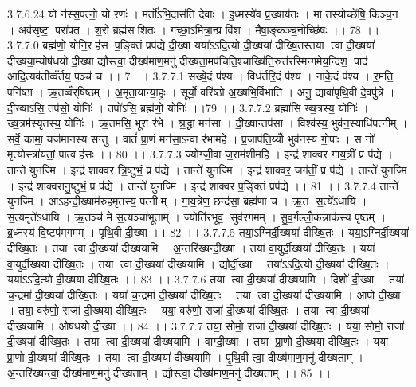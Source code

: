 3.7.6.24
यो न॑स्स॒पत्नो॒ यो रणः॑ । मर्तो॑ऽभि॒दास॑ति देवाः । इ॒ध्मस्ये॑व प्र॒ख्षाय॑तः । मा तस्योच्छे॑षि॒ किञ्च॒न । अव॑सृष्ट॒ परा॑पत । श॒रो ब्रह्म॑सशितः । गच्छा॒ऽमित्रा॒न्प्र वि॑श । मैषा॒ङ्कञ्च॒नोच्छि॑षः ।। 78 ।।
3.7.7.0
ब्रह्म॑णो॒ योनि॒रह॑स प॒ङ्क्तिं प्रप॑द्ये दी॒ख्षा यया॑ऽऽदि॒त्यो दी॒ख्षया॑ दीख्षि॒तस्तया त्वा दी॒ख्षया॑ दीख्षया॒म्योष॑धयो दी॒ख्षा द्यौस्त्वा॒ दीख्ष॑माण॒मनु॑ दीख्षता॒मप॑चिति॒श्चाख्षि॑ति॒रुत्त॑रस्मिन्गमेय॒न्दिश॒ पाद॑ आदि॒त्यव॑तीव्वँर्तय॒ पञ्च॑ च ।। 7 ।।
3.7.7.1
सख्षे॒दं प॑श्य । विध॑र्तरि॒दं प॑श्य । नाके॒दं प॑श्य । र॒मति॒ पनि॑ष्ठा । ऋ॒तव्वँर्‌षि॑ष्ठम् । अ॒मृता॒यान्या॒हुः । सूर्यो॒ वरि॑ष्ठो अ॒ख्षभि॒र्विभा॑ति । अनु॒ द्यावा॑पृथि॒वी दे॒वपु॑त्रे । दी॒ख्षाऽसि॒ तप॑सो॒ योनिः॑ । तपो॑ऽसि॒ ब्रह्म॑णो॒ योनिः॑ ।।79 ।।
3.7.7.2
ब्रह्मा॑सि ख्ष॒त्रस्य॒ योनिः॑ । ख्ष॒त्रम॑स्यृ॒तस्य॒ योनिः॑ । ऋ॒तम॑सि॒ भूरा र॑भे । श्र॒द्धां मन॑सा । दी॒ख्षान्तप॑सा । विश्व॑स्य॒ भुव॑न॒स्याधि॑पत्नीम् । सर्वे॒ कामा॒ यज॑मानस्य सन्तु । वातं॑ प्रा॒णं मन॑सा॒ऽन्वा र॑भामहे । प्र॒जाप॑ति॒य्योँ भुव॑नस्य गो॒पाः । स नो॑ मृ॒त्योस्त्रा॑यतां॒ पात्वह॑सः ।। 80 ।।
3.7.7.3
ज्योग्जी॒वा ज॒राम॑शीमहि । इन्द्र॑ शाक्वर गाय॒त्रीं प्र प॑द्ये । तान्ते॑ युनज्मि । इन्द्र॑ शाक्वर त्रि॒ष्टुभं॒ प्र प॑द्ये । तान्ते॑ युनज्मि । इन्द्र॑ शाक्वर॒ जग॑तीं॒ प्र प॑द्ये । तान्ते॑ युनज्मि । इन्द्र॑ शाक्वरानु॒ष्टुभं॒ प्र प॑द्ये । तान्ते॑ युनज्मि । इन्द्र॑ शाक्वर प॒ङ्क्तिं प्रप॑द्ये ।। 81 ।।
3.7.7.4
तान्ते॑ युनज्मि । आऽहन्दी॒ख्षाम॑रुहमृ॒तस्य॒ पत्नीम् । गा॒य॒त्रेण॒ छन्द॑सा॒ ब्रह्म॑णा च । ऋ॒त स॒त्ये॑ऽधायि । स॒त्यमृ॒ते॑ऽधायि । ऋ॒तञ्च॑ मे स॒त्यञ्चा॑भूताम् । ज्योति॑रभूव॒॒ सुव॑रगमम् । सु॒व॒र्गल्लोँ॒कन्नाक॑स्य पृ॒ष्ठम् । ब्र॒ध्नस्य॑ वि॒ष्टप॑मगमम् । पृ॒थि॒वी दी॒ख्षा ।। 82 ।।
3.7.7.5
तया॒ऽग्निर्दी॒ख्षया॑ दीख्षि॒तः । यया॒ऽग्निर्दी॒ख्षया॑ दीख्षि॒तः । तया त्वा दी॒ख्षया॑ दीख्षयामि । अ॒न्तरि॑ख्षन्दी॒ख्षा । तया॑ वा॒युर्दी॒ख्षया॑ दीख्षि॒तः । यया॑ वा॒युर्दी॒ख्षया॑ दीख्षि॒तः । तया त्वा दी॒ख्षया॑ दीख्षयामि । द्यौर्दी॒ख्षा । तया॑ऽऽदि॒त्यो दी॒ख्षया॑ दीख्षि॒तः । यया॑ऽऽदि॒त्यो दी॒ख्षया॑ दीख्षि॒तः ।। 83 ।।
3.7.7.6
तया त्वा दी॒ख्षया॑ दीख्षयामि । दिशो॑ दी॒ख्षा । तया॑ च॒न्द्रमा॑ दी॒ख्षया॑ दीख्षि॒तः । यया॑ च॒न्द्रमा॑ दी॒ख्षया॑ दीख्षि॒तः । तया त्वा दी॒ख्षया॑ दीख्षयामि । आपो॑ दी॒ख्षा । तया॒ वरु॑णो॒ राजा॑ दी॒ख्षया॑ दीख्षि॒तः । यया॒ वरु॑णो॒ राजा॑ दी॒ख्षया॑ दीख्षि॒तः । तया त्वा दी॒ख्षया॑ दीख्षयामि । ओष॑धयो दी॒ख्षा ।। 84 ।।
3.7.7.7
तया॒ सोमो॒ राजा॑ दी॒ख्षया॑ दीख्षि॒तः । यया॒ सोमो॒ राजा॑ दी॒ख्षया॑ दीख्षि॒तः । तया त्वा दी॒ख्षया॑ दीख्षयामि । वाग्दी॒ख्षा । तया प्रा॒णो दी॒ख्षया॑ दीख्षि॒तः । यया प्रा॒णो दी॒ख्षया॑ दीख्षि॒तः । तया त्वा दी॒ख्षया॑ दीख्षयामि । पृ॒थि॒वी त्वा॒ दीख्ष॑माण॒मनु॑ दीख्षताम् । अ॒न्तरि॑ख्षन्त्वा॒ दीख्ष॑माण॒मनु॑ दीख्षताम् । द्यौस्त्वा॒ दीख्ष॑माण॒मनु॑ दीख्षताम् ।। 85 ।।
